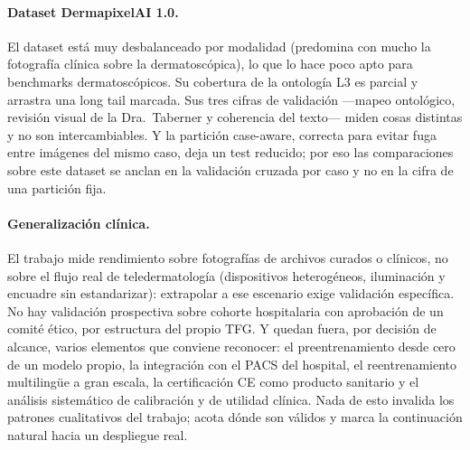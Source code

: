 \paragraph{Dataset DermapixelAI 1.0.} El dataset está muy desbalanceado
por modalidad (predomina con mucho la fotografía clínica sobre la
dermatoscópica), lo que lo hace poco apto para benchmarks
dermatoscópicos. Su cobertura de la ontología L3 es parcial y arrastra
una long tail marcada. Sus tres cifras de validación ---mapeo ontológico,
revisión visual de la Dra.~Taberner y coherencia del texto--- miden cosas
distintas y no son intercambiables. Y la partición case-aware, correcta
para evitar fuga entre imágenes del mismo caso, deja un test reducido;
por eso las comparaciones sobre este dataset se anclan en la validación
cruzada por caso y no en la cifra de una partición fija.

\paragraph{Generalización clínica.}
\label{sec:alcance}
El trabajo mide rendimiento sobre fotografías de archivos curados o
clínicos, no sobre el flujo real de teledermatología (dispositivos
heterogéneos, iluminación y encuadre sin estandarizar): extrapolar a ese
escenario exige validación específica. No hay validación prospectiva
sobre cohorte hospitalaria con aprobación de un comité ético, por
estructura del propio TFG. Y quedan fuera, por decisión de alcance,
varios elementos que conviene reconocer: el preentrenamiento desde cero
de un modelo propio, la integración con el PACS del hospital, el
reentrenamiento multilingüe a gran escala, la certificación CE como
producto sanitario y el análisis sistemático de calibración y de utilidad
clínica. Nada de esto invalida los patrones cualitativos del trabajo;
acota dónde son válidos y marca la continuación natural hacia un
despliegue real.
